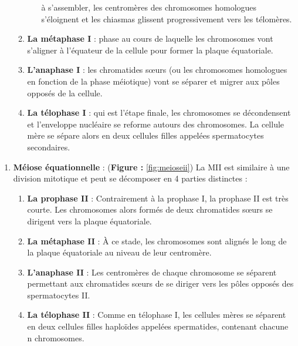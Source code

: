 \documentclass[12pt,twoside]{reedthesis}
\providecommand{\tightlist}{%
  \setlength{\itemsep}{0pt}\setlength{\parskip}{0pt}}
\theoremstyle{definition}
\theoremstyle{definition}
\theoremstyle{remark}
\begin{document}
\begin{enumerate}
\begin{enumerate}
\begin{enumerate}
        à s'assembler, les centromères des chromosomes homologues
        s'éloignent et les chiasmas glissent progressivement vers les
        télomères.\\
      \end{enumerate}
    \item
      \textbf{La métaphase I} : phase au cours de laquelle les chromosomes
      vont s'aligner à l'équateur de la cellule pour former la plaque
      équatoriale.
    \item
      \textbf{L'anaphase I} : les chromatides sœurs (ou les chromosomes
      homologues en fonction de la phase méiotique) vont se séparer et
      migrer aux pôles opposés de la cellule.\\
    \item
      \textbf{La télophase I} : qui est l'étape finale, les chromosomes se
      décondensent et l'enveloppe nucléaire se reforme autours des
      chromosomes. La cellule mère se sépare alors en deux cellules filles
      appelées spermatocytes secondaires.
    \end{enumerate}
  \end{enumerate}
  
  \newpage
  
  \begin{enumerate}
  \def\labelenumi{\arabic{enumi}.}
  \setcounter{enumi}{1}
  \tightlist
  \item
    \textbf{Méiose équationnelle} : (\textbf{Figure : }\ref{fig:meioseii})
    La MII est similaire à une division mitotique et peut se décomposer en
    4 parties distinctes :
  
    \begin{enumerate}
    \def\labelenumii{\alph{enumii}.}
    \tightlist
    \item
      \textbf{La prophase II} : Contrairement à la prophase I, la prophase
      II est très courte. Les chromosomes alors formés de deux chromatides
      sœurs se dirigent vers la plaque équatoriale.\\
    \item
      \textbf{La métaphase II} : À ce stade, les chromosomes sont alignés
      le long de la plaque équatoriale au niveau de leur centromère.\\
    \item
      \textbf{L'anaphase II} : Les centromères de chaque chromosome se
      séparent permettant aux chromatides sœurs de se diriger vers les
      pôles opposés des spermatocytes II.\\
    \item
      \textbf{La télophase II} : Comme en télophase I, les cellules mères
      se séparent en deux cellules filles haploïdes appelées spermatides,
      contenant chacune n chromosomes.
    \end{enumerate}
  \end{enumerate}
  
\end{document}
